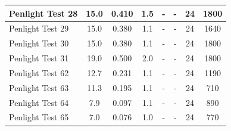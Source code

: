 \begin{table}[!ht]
\begin{center}
\begin{tabular}{|l|c|c|c|c|c|c|c|}
Penlight Test 28  &  15.0      &  0.410        &  1.5        &  -         &  -          &  24               &  1800         \\ \hline
Penlight Test 29  &  15.0      &  0.380        &  1.1        &  -         &  -          &  24               &  1640         \\ \hline
Penlight Test 30  &  15.0      &  0.380        &  1.1        &  -         &  -          &  24               &  1800         \\ \hline
Penlight Test 31  &  19.0      &  0.500        &  2.0        &  -         &  -          &  24               &  1800         \\ \hline
Penlight Test 62  &  12.7      &  0.231        &  1.1        &  -         &  -          &  24               &  1190         \\ \hline
Penlight Test 63  &  11.3      &  0.195        &  1.1        &  -         &  -          &  24               &  710          \\ \hline
Penlight Test 64  &   7.9      &  0.097        &  1.1        &  -         &  -          &  24               &  890          \\ \hline
Penlight Test 65  &   7.0      &  0.076        &  1.0        &  -         &  -          &  24               &  770          \\ \hline
\end{tabular}
\end{center}
\end{table}


\clearpage


